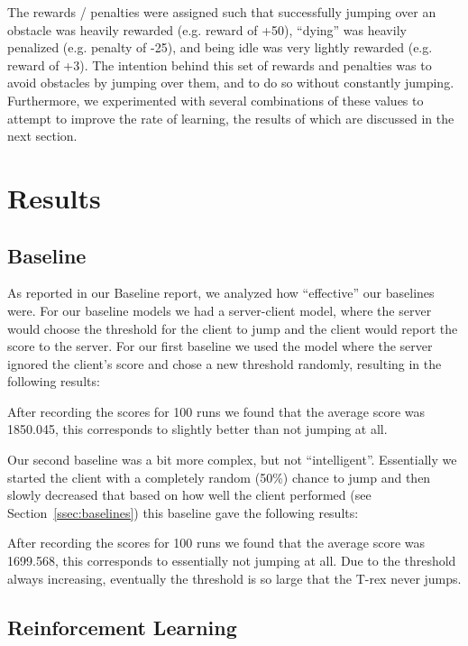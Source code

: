 \documentclass{scrartcl}
\begin{document}
    The rewards / penalties were assigned such that successfully jumping over an
    obstacle was heavily rewarded (e.g. reward of +50), ``dying'' was heavily
    penalized (e.g. penalty of -25), and being idle was very lightly rewarded
    (e.g. reward of +3). The intention behind this set of rewards and penalties
    was to avoid obstacles by jumping over them, and to do so without constantly
    jumping. Furthermore, we experimented with several combinations of these
    values to attempt to improve the rate of learning, the results of which are
    discussed in the next section.

\section{Results}

    \subsection{Baseline}
    As reported in our Baseline report, we analyzed how ``effective'' our
    baselines were. For our baseline models we had a server-client model, where
    the server would choose the threshold for the client to jump and the client
    would report the score to the server. For our first baseline we used the
    model where the server ignored the client's score and chose a new threshold
    randomly, resulting in the following results:

    After recording the scores for 100 runs we found that the average score was
    1850.045, this corresponds to slightly better than not jumping at all.

    Our second baseline was a bit more complex, but not ``intelligent''.
    Essentially we started the client with a completely random (50\%) chance to
    jump and then slowly decreased that based on how well the client performed
    (see Section~\ref{ssec:baselines}) this baseline gave the following results:

    After recording the scores for 100 runs we found that the average score was
    1699.568, this corresponds to essentially not jumping at all. Due to the
    threshold always increasing, eventually the threshold is so large that the
    T-rex never jumps.

    \subsection{Reinforcement Learning}
\end{document}
